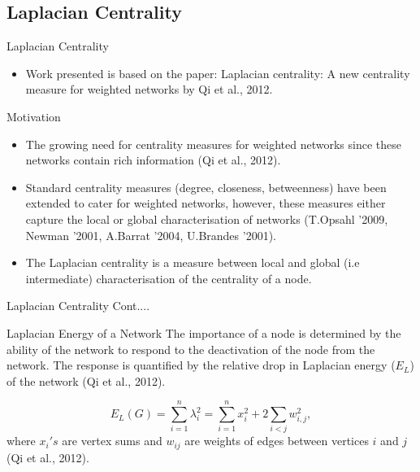 \documentclass{beamer}
\begin{document}
\subsection{Laplacian Centrality}
\begin{frame}{Laplacian Centrality}
	\begin{itemize}
		\item Work presented is based on the paper: Laplacian centrality: A new centrality measure for weighted networks  by Qi et al., 2012.
	\end{itemize}
	 \vspace{0.2cm}
	\begin{block}{Motivation}
		\begin{itemize}
		\item The growing need for centrality measures for weighted networks since these networks contain rich information (Qi et al., 2012).
		\vspace{0.2cm}
		\pause
		\item  Standard centrality measures (degree, closeness, betweenness) have been extended to cater for weighted networks, however, these measures either capture the local or global characterisation of networks (T.Opsahl '2009, Newman '2001, A.Barrat '2004, U.Brandes '2001). 
		\vspace{0.2cm}
		\pause
		\item The Laplacian centrality is a measure between local and global (i.e intermediate) characterisation of the centrality of a node.
	    \end{itemize}
\end{block}
\end{frame}

\begin{frame}{Laplacian Centrality Cont....}
	\begin{block}{Laplacian Energy of a Network}
		The importance of a node is determined by the ability of the network to respond to the deactivation  of the node from the network. The response is quantified by the relative drop in Laplacian energy ($E_{L}$) of the network (Qi et al., 2012).
      \vspace{0.4cm}
		
		\begin{equation}
		E_L(G) = \sum_{i=1}^n \lambda_i ^2 = \sum_{i=1}^n x_i^2 + 2 \sum_{i<j} w_{i,j}^2,
		\end{equation}
		 where $x_i's$ are vertex sums and $w_{ij}$ are weights of edges between vertices $i$ and $j$ (Qi et al., 2012).
	\end{block}
\end{frame}
\end{document}
